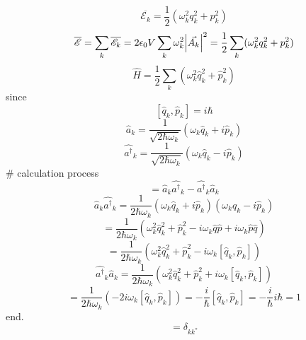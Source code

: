 \documentclass[9pt]{article}
\begin{document}
\begin{equation}
    \overline{\mathscr{E}_k}=\frac{1}{2}(\omega^2_k q^2_k + p^2_k)
\end{equation}
\begin{equation}
    \overline{\mathscr{E}}=\sum_k\overline{\mathscr{E}_k}=2\epsilon_0 V \sum_k\omega^2_k \abs{\vec{A_k}}^2
    =\frac{1}{2}\sum_k(\omega^2_k q^2_k + p^2_k)
\end{equation}
\begin{equation}
    \hat{H}=\frac{1}{2}\sum_k(\omega^2_k \hat{q}^2_k + \hat{p}^2_k)
\end{equation}
since $$ [\hat{q}_k,\hat{p}_k]=i\hbar $$
\begin{equation}
    \hat{a}_k=\frac{1}{\sqrt{2\hbar \omega_k}}(\omega_k \hat{q}_k + i\hat{p}_k)
\end{equation}
\begin{equation}
    \hat{a^\dagger}_k=\frac{1}{\sqrt{2\hbar \omega_k}}(\omega_k \hat{q}_k - i\hat{p}_k)
\end{equation}
\# calculation process
\begin{equation*}
    [\hat{a}_k,\hat{a^\dagger}_k]=\hat{a}_k\hat{a^\dagger}_k-\hat{a^\dagger}_k\hat{a}_k
\end{equation*}
\begin{equation*}
    \hat{a}_k\hat{a^\dagger}_k = 
    \frac{1}{2\hbar \omega_k}(\omega_k \hat{q}_k + i\hat{p}_k)(\omega_k \hat{q}_k - i\hat{p}_k)
\end{equation*}
\begin{equation*}
    =\frac{1}{2\hbar \omega_k}(\omega^2_k \hat{q}^2_k + \hat{p}^2_k  -i\omega_k\hat{q}\hat{p}+i\omega_k\hat{p}\hat{q})
\end{equation*}
\begin{equation*}
    =\frac{1}{2\hbar \omega_k}(\omega^2_k \hat{q}^2_k + \hat{p}^2_k-i\omega_k[\hat{q}_k,\hat{p}_k])
\end{equation*}
\begin{equation*}
    \hat{a^\dagger}_k\hat{a}_k =\frac{1}{2\hbar \omega_k}(\omega^2_k \hat{q}^2_k + \hat{p}^2_k+i\omega_k[\hat{q}_k,\hat{p}_k])
\end{equation*}
\begin{equation*}
    [\hat{a}_k,\hat{a^\dagger}_k]=\frac{1}{2\hbar \omega_k}(-2i\omega_k [\hat{q}_k,\hat{p}_k])
    =-\frac{i}{\hbar} [\hat{q}_k,\hat{p}_k] = -\frac{i}{\hbar} i\hbar = 1
\end{equation*}
end.
\begin{equation}
    [\hat{a}_k,\hat{a^\dagger}_k]= \delta_{kk^*}
\end{equation}
\end{document}
